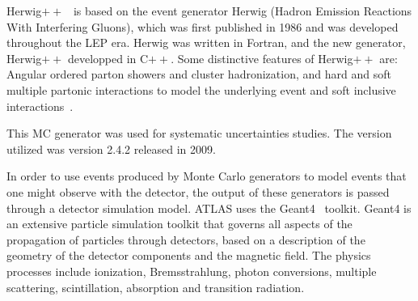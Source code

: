 {\sc Herwig}$++$~\cite{HerwigPP} is based on the event generator {\sc Herwig} (Hadron Emission Reactions With Interfering Gluons), which was first published in 1986 and was developed throughout the LEP era.  {\sc Herwig} was written in Fortran, and the new generator, Herwig$++$ developped in C$++$. 
Some distinctive features of Herwig$++$ are: Angular ordered parton showers and cluster hadronization, and 
hard and soft multiple partonic interactions to model the underlying event and soft inclusive interactions~\cite{1126-6708-2008-07-076}.

This MC generator was used for systematic uncertainties studies. The version utilized was version 2.4.2 released in 2009. 

\vspace{1cm}
In order to use events produced by Monte Carlo generators to model events that one might observe with the detector, the output of these generators is passed through a detector simulation model.  ATLAS uses the {\sc Geant}4~\cite{Geant4} toolkit. {\sc Geant}4  is an extensive particle simulation toolkit that governs all aspects of the propagation of particles through detectors, based on a description of the geometry of the detector components and the magnetic field. The physics processes include ionization, Bremsstrahlung, photon conversions, multiple scattering, scintillation, absorption and transition radiation.

